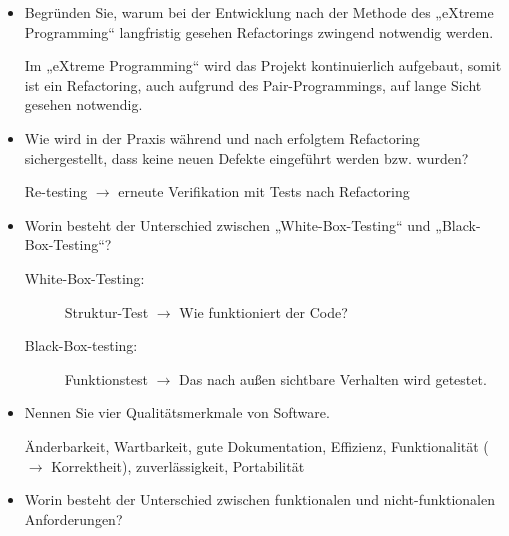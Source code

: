 \documentclass{lehramt-informatik-minimal}
\begin{document}
\begin{itemize}
\item Begründen Sie, warum bei der Entwicklung nach der Methode des
„eXtreme Programming“ langfristig gesehen Refactorings zwingend notwendig
werden.

\begin{antwort}
Im „eXtreme Programming“ wird das Projekt kontinuierlich aufgebaut,
somit ist ein Refactoring, auch aufgrund des Pair-Programmings, auf
lange Sicht gesehen notwendig.
\end{antwort}

%

\item Wie wird in der Praxis während und nach erfolgtem Refactoring
sichergestellt, dass keine neuen Defekte eingeführt werden bzw. wurden?

\begin{antwort}
Re-testing $\rightarrow$ erneute Verifikation mit Tests nach Refactoring
\end{antwort}

%

\item Worin besteht der Unterschied zwischen „White-Box-Testing“ und
„Black-Box-Testing“?

\begin{antwort}
\begin{description}
\item[White-Box-Testing:]
Struktur-Test $\rightarrow$ Wie funktioniert der Code?

\item[Black-Box-testing:]
Funktionstest $\rightarrow$ Das nach außen sichtbare Verhalten wird
getestet.
\end{description}
\end{antwort}

%

\item Nennen Sie vier Qualitätsmerkmale von Software.

\begin{antwort}
Änderbarkeit, Wartbarkeit, gute Dokumentation, Effizienz, Funktionalität
($\rightarrow$ Korrektheit), zuverlässigkeit, Portabilität
\end{antwort}

%

\item Worin besteht der Unterschied zwischen funktionalen und
nicht-funktionalen Anforderungen?

\end{itemize}
\end{document}
